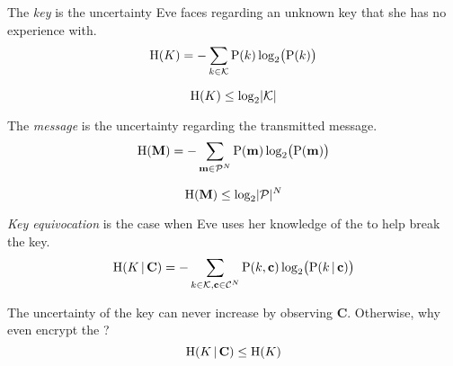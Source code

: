 \begin{definition}\label{def:Key_Entropy}
  The \emph{key } is the uncertainty Eve faces regarding an unknown key that she has no experience with.
  \begin{equation}\label{eq:Key_Entropy}
    \operatorname{\operatorname{H}}(K) = - \sum\limits_{k \in \operatorname{\mathcal{K}}} \operatorname{\operatorname{P}}(k) \log_{2} \bigl( \operatorname{\operatorname{P}}(k) \bigr)
  \end{equation}

  \begin{remark}\label{rmk:Key_Entropy_Upper_Bound}
    \begin{equation}\label{eq:Key_Entropy_Upper_Bound}
      \operatorname{\operatorname{H}}(K) \leq \log_{2} \lvert \operatorname{\mathcal{K}} \rvert
    \end{equation}
  \end{remark}
\end{definition}

\begin{definition}\label{def:Message_Entropy}
  The \emph{message } is the uncertainty regarding the transmitted message.
  \begin{equation}\label{eq:Message_Entropy}
    \operatorname{\operatorname{H}}(\mathbf{M}) = - \sum\limits_{\mathbf{m} \in \operatorname{\mathcal{P}}^{N}} \operatorname{\operatorname{P}}(\mathbf{m}) \log_{2} \bigl( \operatorname{\operatorname{P}}(\mathbf{m}) \bigr)
  \end{equation}

  \begin{remark}\label{rmk:Message_Entropy_Upper_Bound}
    \begin{equation}\label{eq:Message_Entropy_Upper_Bound}
      \operatorname{\operatorname{H}}(\mathbf{M}) \leq \log_{2} \lvert \operatorname{\mathcal{P}} \rvert^{N}
    \end{equation}
  \end{remark}
\end{definition}

\begin{definition}\label{def:Key_Equivocation}
  \emph{Key equivocation} is the case when Eve uses her knowledge of the  to help break the key.
  \begin{equation}\label{eq:Key_Equivocation}
    \operatorname{\operatorname{H}}(K \operatorname{\vert} \mathbf{C}) = - \sum\limits_{k \in \operatorname{\mathcal{K}}, \mathbf{c} \in \operatorname{\mathcal{C}}^{N}} \operatorname{\operatorname{P}}(k, \mathbf{c}) \log_{2} \bigl( \operatorname{\operatorname{P}}(k \operatorname{\vert} \mathbf{c}) \bigr)
  \end{equation}

  \begin{remark}\label{def:Key_Equivocation_Upper_Bound}
    The uncertainty of the key can never increase by observing $\mathbf{C}$.
    Otherwise, why even encrypt the ?
    \begin{equation}\label{eq:Key_Equivocation_Upper_Bound}
      \operatorname{\operatorname{H}}(K \operatorname{\vert} \mathbf{C}) \leq \operatorname{\operatorname{H}}(K)
    \end{equation}
  \end{remark}
\end{definition}


